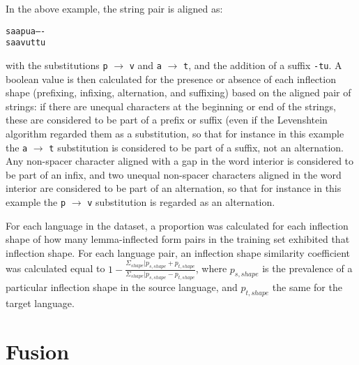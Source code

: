 In the above example, the string pair is aligned as:
\begin{center}
\texttt{saapua----} \\
\texttt{saavuttu}
\end{center}
with the substitutions \texttt{p} $\rightarrow$ \texttt{v} and \texttt{a} $\rightarrow$ \texttt{t}, and the addition of a suffix \texttt{-tu}. A boolean value is then calculated for the presence or absence of each inflection shape (prefixing, infixing, alternation, and suffixing) based on the aligned pair of strings: if there are unequal characters at the beginning or end of the strings, these are considered to be part of a prefix or suffix (even if the Levenshtein algorithm regarded them as a substitution, so that for instance in this example the \texttt{a} $\rightarrow$ \texttt{t} substitution is considered to be part of a suffix, not an alternation. Any non-spacer character aligned with a gap in the word interior is considered to be part of an infix, and two unequal non-spacer characters aligned in the word interior are considered to be part of an alternation, so that for instance in this example the \texttt{p} $\rightarrow$ \texttt{v} substitution is regarded as an alternation. 

For each language in the dataset, a proportion was calculated for each inflection shape of how many lemma-inflected form pairs in the training set exhibited that inflection shape. For each language pair, an inflection shape similarity coefficient was calculated equal to $1 - \frac{\Sigma_{shape} |p_{s, shape} + p_{t, shape}}{\Sigma_{shape} |p_{s, shape} - p_{t, shape}}$, where $p_{s, shape}$ is the prevalence of a particular inflection shape in the source language, and $p_{t, shape}$ the same for the target language.

\section{Fusion}

